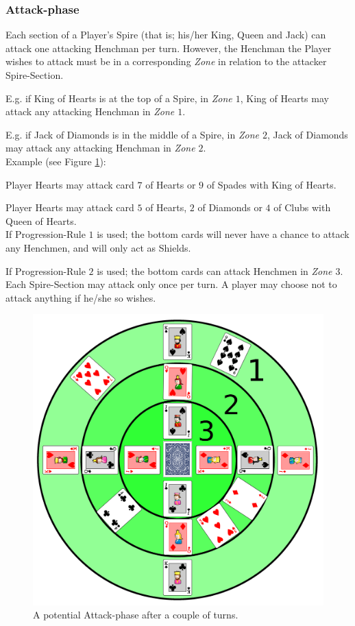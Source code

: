 \documentclass[11pt,twocolumn]{article}
\begin{document}
\subsubsection{Attack-phase}
\label{sec:playingshufflespires_attackphase}
Each section of a Player's Spire (that is; his/her King, Queen and Jack) can attack one attacking Henchman per turn.
However, the Henchman the Player wishes to attack must be in a corresponding \textit{Zone} in relation to the attacker Spire-Section.

E.g. if King of Hearts is at the top of a Spire, in \textit{Zone $1$}, King of Hearts may attack any attacking Henchman in \textit{Zone $1$}.

E.g. if Jack of Diamonds is in the middle of a Spire, in \textit{Zone $2$}, Jack of Diamonds may attack any attacking Henchman in \textit{Zone $2$}.\\

\noindent
Example (see Figure \ref{fig:attack}):

Player Hearts may attack card $7$ of Hearts or $9$ of Spades with King of Hearts.

Player Hearts may attack card $5$ of Hearts, $2$ of Diamonds or $4$ of Clubs with Queen of Hearts.\\

\noindent
If Progression-Rule $1$ is used; the bottom cards will never have a chance to attack any Henchmen, and will only act as Shields.

If Progression-Rule $2$ is used; the bottom cards can attack Henchmen in \textit{Zone $3$}. \\

\noindent
Each Spire-Section may attack only once per turn. A player may choose not to attack anything if he/she so wishes.

\begin{figure}[h!]
\centering
\includegraphics[width=\linewidth]{img/attack.png}
\caption{A potential Attack-phase after a couple of turns.}
\label{fig:attack}
\end{figure}
\end{document}
